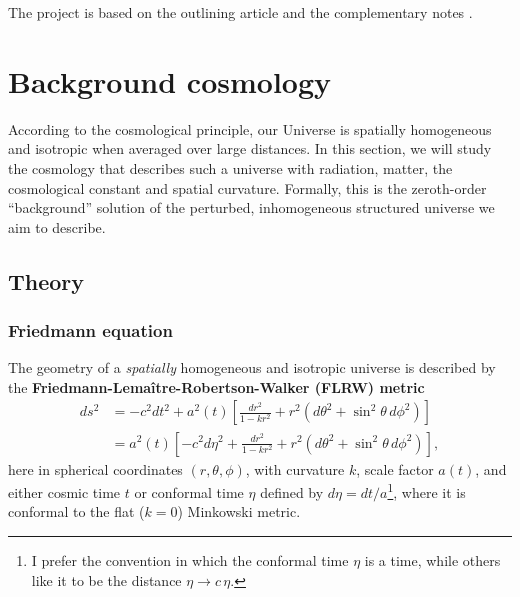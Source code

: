 \documentclass[10pt,a4paper]{article}
\begin{document}
The project is based on the outlining article \cite{callinHowCalculateCMB2006}
and the complementary notes \cite{wintherCosmologyIINumerical}.

\clearpage

\section{Background cosmology}
\label{sec_background_cosmology}

According to the cosmological principle,
our Universe is spatially homogeneous and isotropic when averaged over large distances.
In this section, we will study the cosmology that describes such a universe
with radiation, matter, the cosmological constant and spatial curvature.
Formally, this is the zeroth-order ``background'' solution of the perturbed, inhomogeneous structured universe we aim to describe.

\subsection{Theory}
\label{sec_background_cosmology_theory}

\subsubsection*{Friedmann equation}

The geometry of a \emph{spatially} homogeneous and isotropic universe
is described by the \textbf{Friedmann-Lemaître-Robertson-Walker (FLRW) metric}
\begin{equation}
\begin{split}
	ds^2 &= -c^2 dt^2 + a^2(t) \left[\frac{dr^2}{1 - kr^2} + r^2\left(d\theta^2 + \sin^2\theta \, d\phi^2\right) \right] \\
	     &= a^2(t) \left[-c^2 d\eta^2 + \frac{dr^2}{1 - kr^2} + r^2\left(d\theta^2 + \sin^2\theta \, d\phi^2\right) \right],
\end{split}
\label{eq_flrw}
\end{equation}
here in spherical coordinates $(r,\theta,\phi)$, with curvature $k$, scale factor $a(t)$,
and either cosmic time $t$ or conformal time $\eta$ defined by $d\eta = dt/a$\footnote{I prefer the convention in which the conformal time $\eta$ is a time, while others like it to be the distance $\eta \rightarrow c \, \eta$.},
where it is conformal to the flat ($k=0$) Minkowski metric.
\end{document}

